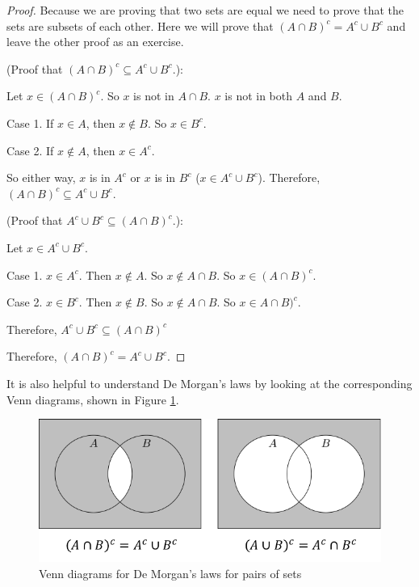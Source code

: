 \documentclass[
]{book}
\theoremstyle{definition}
\theoremstyle{definition}
\theoremstyle{definition}
\theoremstyle{definition}
\theoremstyle{remark}
\begin{document}
\begin{proof}
Because we are proving that two sets are equal we need to prove that the sets are subsets of each other. Here we will prove that \(\left(A \cap B\right)^c = A^c \cup B^c\) and leave the other proof as an exercise.

(Proof that \(\left(A \cap B\right)^c \subseteq A^c \cup B^c\).):

Let \(x\in \left(A \cap B\right)^c\). So \(x\) is not in \(A\cap B\). \(x\) is not in both \(A\) and \(B\).

Case 1. If \(x\in A\), then \(x\notin B\). So \(x\in B^c\).

Case 2. If \(x\notin A\), then \(x\in A^c\).

So either way, \(x\) is in \(A^c\) or \(x\) is in \(B^c\) (\(x\in A^c \cup B^c\)). Therefore, \(\left(A \cap B\right)^c \subseteq A^c \cup B^c\).

(Proof that \(A^c \cup B^c \subseteq \left(A \cap B\right)^c\).):

Let \(x \in A^c \cup B^c\).

Case 1. \(x\in A^c\). Then \(x\notin A\). So \(x\notin A\cap B\). So \(x\in (A\cap B)^c\).

Case 2. \(x\in B^c\). Then \(x\notin B\). So \(x\notin A\cap B\). So \(x\in A\cap B)^c\).

Therefore, \(A^c \cup B^c \subseteq \left(A \cap B\right)^c\)

Therefore, \(\left(A \cap B\right)^c = A^c \cup B^c\).
\end{proof}

It is also helpful to understand De Morgan's laws by looking at the corresponding Venn diagrams, shown in Figure \ref{fig:demorgan}.

\begin{figure}

{\centering \includegraphics[width=0.8\linewidth]{tikz/demorgan} 

}

\caption{Venn diagrams for De Morgan's laws for pairs of sets}\label{fig:demorgan}
\end{figure}
\end{document}
